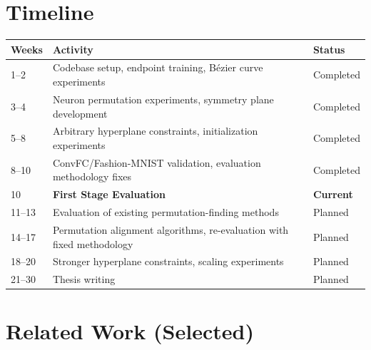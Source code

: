 \documentclass[11pt,a4paper]{article}
\begin{document}
\section{Timeline}
\begin{table}[H]
\centering
\begin{tabular}{l l l}
\toprule
\textbf{Weeks} & \textbf{Activity} & \textbf{Status} \\
\midrule
1--2 & Codebase setup, endpoint training, B\'{e}zier curve experiments & Completed \\
3--4 & Neuron permutation experiments, symmetry plane development & Completed \\
5--8 & Arbitrary hyperplane constraints, initialization experiments & Completed \\
8--10 & ConvFC/Fashion-MNIST validation, evaluation methodology fixes & Completed \\
10 & \textbf{First Stage Evaluation} & \textbf{Current} \\
\midrule
11--13 & Evaluation of existing permutation-finding methods & Planned \\
14--17 & Permutation alignment algorithms, re-evaluation with fixed methodology & Planned \\
18--20 & Stronger hyperplane constraints, scaling experiments & Planned \\
21--30 & Thesis writing & Planned \\
\bottomrule
\end{tabular}
\end{table}


\section{Related Work (Selected)}
\end{document}
